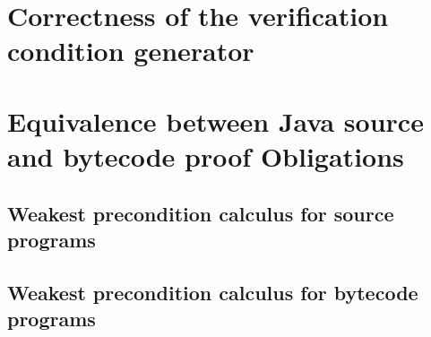 \documentclass[book,10pt]{book}
\begin{document}
\chapter{Correctness of the verification condition generator}\label{proofGeneral}
  
  
  

\chapter{Equivalence between Java source and bytecode proof Obligations}
       
       

       
   
   
	 

       
        
        
        
       


	 
       \section{Weakest precondition calculus for source programs}\label{pog:wpSrcGeneral}
           
	  	  
	  
	  

       \section{Weakest precondition calculus for bytecode programs}\label{pog:wpBcGeneral}
          
	  
	   


\end{document}
